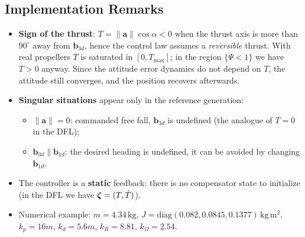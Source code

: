 \documentclass[10pt, a4paper]{report}
\begin{document}
\subsection{Implementation Remarks}
\begin{itemize}
    \item \textbf{Sign of the thrust}: $T=\|\mathbf a\|\cos\alpha<0$ when the thrust axis is more than $90^\circ$ away from $\mathbf b_{3d}$, hence the control law assumes a \textit{reversible} thrust. With real propellers $T$ is saturated in $[0,T_{\max}]$; in the region $\{\Psi<1\}$ we have $T>0$ anyway. Since the attitude error dynamics do not depend on $T$, the attitude still converges, and the position recovers afterwards.
    \item \textbf{Singular situations} appear only in the reference generation:\begin{itemize}
        \item $\|\mathbf a\|=0$: commanded free fall, $\mathbf b_{3d}$ is undefined (the analogue of $T=0$ in the DFL);
        \item $\mathbf b_{3d}\parallel\mathbf b_{1d}$: the desired heading is undefined, it can be avoided by changing $\mathbf b_{1d}$.
    \end{itemize}
    \item The controller is a \textbf{static} feedback: there is no compensator state to initialize (in the DFL we have ${\boldsymbol{\zeta}}=(T,\dot T)$).
    \item Numerical example: $m=4.34\,\text{kg}$, $J=\text{diag}(0.082,0.0845,0.1377)\,\text{kg}\,\text{m}^2$, $k_p=16m$, $k_d=5.6m$, $k_R=8.81$, $k_\Omega=2.54$.
\end{itemize}
\end{document}
